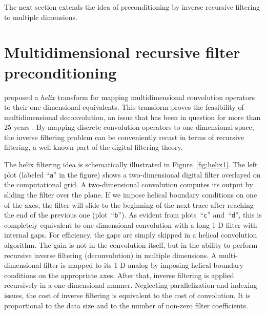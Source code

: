 The next section extends the idea of preconditioning by inverse
recursive filtering to multiple dimensions.

\section{Multidimensional recursive filter preconditioning}


\cite{helix} proposed a \emph{helix} transform for mapping
multidimensional convolution operators to their one-dimensional
equivalents.  This transform proves the feasibility of
multidimensional deconvolution, an issue that has been in question for
more than 25 years \cite[]{Claerbout.blackwell.76}.  By mapping discrete
convolution operators to one-dimensional space, the inverse filtering
problem can be conveniently recast in terms of recursive filtering, a
well-known part of the digital filtering theory.


The helix filtering idea is schematically illustrated in
Figure~\ref{fig:helix1}. The left plot (labeled ``\texttt{a}'' in the
figure) shows a two-dimensional digital filter overlayed on the
computational grid. A two-dimensional convolution computes its output
by sliding the filter over the plane. If we impose helical boundary
conditions on one of the axes, the filter will slide to the beginning
of the next trace after reaching the end of the previous one
(plot~``\texttt{b}''). As evident from plots~``\texttt{c}''
and~``\texttt{d}'', this is completely equivalent to one-dimensional
convolution with a long 1-D filter with internal gaps.  For
efficiency, the gaps are simply skipped in a helical convolution
algorithm. The gain is not in the convolution
itself, but in the ability to perform recursive inverse filtering
(deconvolution) in multiple dimensions. A multi-dimensional filter is
mapped to its 1-D analog by imposing helical boundary conditions on
the appropriate axes. After that, inverse filtering is applied
recursively in a one-dimensional manner.  Neglecting parallelization
and indexing issues, the cost of inverse filtering is equivalent to
the cost of convolution. It is proportional to the data size and to
the number of non-zero filter coefficients.


